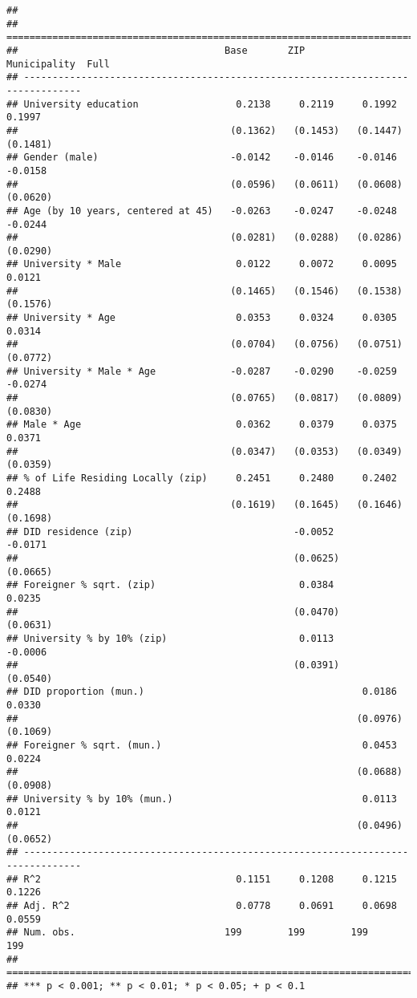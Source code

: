 \documentclass[
]{article}
\begin{document}
\begin{verbatim}
## 
## ================================================================================
##                                    Base       ZIP        Municipality  Full     
## --------------------------------------------------------------------------------
## University education                 0.2138     0.2119     0.1992        0.1997 
##                                     (0.1362)   (0.1453)   (0.1447)      (0.1481)
## Gender (male)                       -0.0142    -0.0146    -0.0146       -0.0158 
##                                     (0.0596)   (0.0611)   (0.0608)      (0.0620)
## Age (by 10 years, centered at 45)   -0.0263    -0.0247    -0.0248       -0.0244 
##                                     (0.0281)   (0.0288)   (0.0286)      (0.0290)
## University * Male                    0.0122     0.0072     0.0095        0.0121 
##                                     (0.1465)   (0.1546)   (0.1538)      (0.1576)
## University * Age                     0.0353     0.0324     0.0305        0.0314 
##                                     (0.0704)   (0.0756)   (0.0751)      (0.0772)
## University * Male * Age             -0.0287    -0.0290    -0.0259       -0.0274 
##                                     (0.0765)   (0.0817)   (0.0809)      (0.0830)
## Male * Age                           0.0362     0.0379     0.0375        0.0371 
##                                     (0.0347)   (0.0353)   (0.0349)      (0.0359)
## % of Life Residing Locally (zip)     0.2451     0.2480     0.2402        0.2488 
##                                     (0.1619)   (0.1645)   (0.1646)      (0.1698)
## DID residence (zip)                            -0.0052                  -0.0171 
##                                                (0.0625)                 (0.0665)
## Foreigner % sqrt. (zip)                         0.0384                   0.0235 
##                                                (0.0470)                 (0.0631)
## University % by 10% (zip)                       0.0113                  -0.0006 
##                                                (0.0391)                 (0.0540)
## DID proportion (mun.)                                      0.0186        0.0330 
##                                                           (0.0976)      (0.1069)
## Foreigner % sqrt. (mun.)                                   0.0453        0.0224 
##                                                           (0.0688)      (0.0908)
## University % by 10% (mun.)                                 0.0113        0.0121 
##                                                           (0.0496)      (0.0652)
## --------------------------------------------------------------------------------
## R^2                                  0.1151     0.1208     0.1215        0.1226 
## Adj. R^2                             0.0778     0.0691     0.0698        0.0559 
## Num. obs.                          199        199        199           199      
## ================================================================================
## *** p < 0.001; ** p < 0.01; * p < 0.05; + p < 0.1
\end{verbatim}
\end{document}
